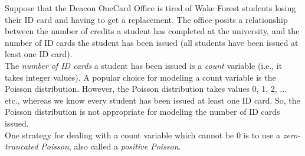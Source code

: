 \documentclass[11pt]{article}
\begin{document}
Suppose that the Deacon OneCard Office is tired of Wake Forest students losing their ID card and having to get a replacement. The office posits a relationship between the number of credits a student has completed at the university, and the number of ID cards the student has been issued (all students have been issued at least one ID card).\\

\noindent The \textit{number of ID cards} a student has been issued is a \textit{count} variable (i.e., it takes integer values). A popular choice for modeling a count variable is the Poisson distribution. However, the Poisson distribution takes values 0, 1, 2, ... etc., whereas we know every student has been issued at least one ID card. So, the Poisson distribution is not appropriate for modeling the number of ID cards issued.\\

\noindent One strategy for dealing with a count variable which cannot be 0 is to use a \textit{zero-truncated Poisson}, also called a \textit{positive Poisson}.
\end{document}
